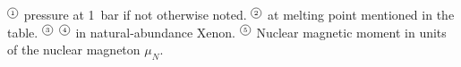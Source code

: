 \begin{table}
\label{tab:samplesproperity}
\footnotesize{
$^{\tiny \cir{1}}$ pressure at \SI{1}{\bar} if not otherwise noted. 
$^{\tiny \cir{2}}$ at melting point mentioned in the table. 
$^{\tiny \cir{3}}$ $^{\tiny \cir{4}}$ in natural-abundance Xenon. 
$^{\tiny \cir{5}}$ Nuclear magnetic moment in units of the nuclear magneton $\mu_N$. }
\end{table}
